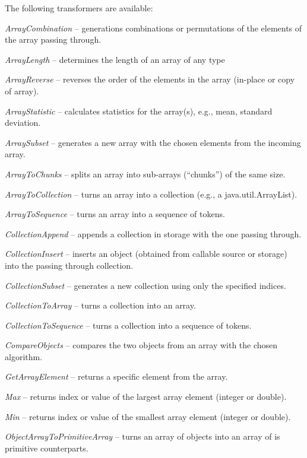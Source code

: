 \noindent The following transformers are available:
\begin{tight_itemize}
	\item \textit{ArrayCombination} -- generations combinations or permutations of
	the elements of the array passing through.
	\item \textit{ArrayLength} -- determines the length of an array of any type
	\item \textit{ArrayReverse} -- reverses the order of the elements in the array
	(in-place or copy of array).
	\item \textit{ArrayStatistic} -- calculates statistics for the array(s), e.g.,
	mean, standard deviation.
	\item \textit{ArraySubset} -- generates a new array with the chosen elements
	from the incoming array.
	\item \textit{ArrayToChunks} -- splits an array into sub-arrays (``chunks'')
	of the same size.
	\item \textit{ArrayToCollection} -- turns an array into a collection (e.g.,
	a java.util.ArrayList).
	\item \textit{ArrayToSequence} -- turns an array into a sequence of tokens.
	\item \textit{CollectionAppend} -- appends a collection in storage with the
	one passing through.
	\item \textit{CollectionInsert} -- inserts an object (obtained from callable
	source or storage) into the passing through collection.
	\item \textit{CollectionSubset} -- generates a new collection using only the
	specified indices.
	\item \textit{CollectionToArray} -- turns a collection into an array.
	\item \textit{CollectionToSequence} -- turns a collection into a sequence of
	tokens.
	\item \textit{CompareObjects} -- compares the two objects from an array
	with the chosen algorithm.
	\item \textit{GetArrayElement} -- returns a specific element from the array.
	\item \textit{Max} -- returns index or value of the largest array element
	(integer or double).
	\item \textit{Min} -- returns index or value of the smallest array element
	(integer or double).
	\item \textit{ObjectArrayToPrimitiveArray} -- turns an array of objects
	into an array of is primitive counterparts.

\end{tight_itemize}
